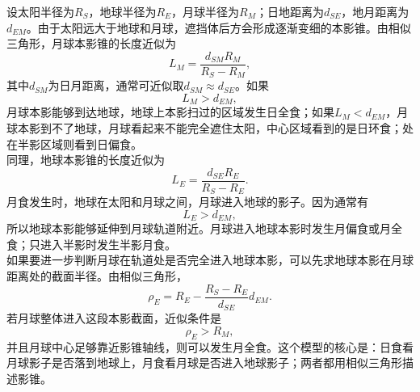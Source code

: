 \begin{casetypebox}[title={\strut\textcolor{white}{\bfseries 常见题型：日食和月食问题}}]
\begin{center}
  \end{center}
  设太阳半径为$R_S$，地球半径为$R_E$，月球半径为$R_M$；日地距离为$d_{SE}$，地月距离为$d_{EM}$。由于太阳远大于地球和月球，遮挡体后方会形成逐渐变细的本影锥。由相似三角形，月球本影锥的长度近似为
  \[
    L_M=\frac{d_{SM}R_M}{R_S-R_M},
  \]
  其中$d_{SM}$为日月距离，通常可近似取$d_{SM}\approx d_{SE}$。如果
  \[
    L_M>d_{EM},
  \]
  月球本影能够到达地球，地球上本影扫过的区域发生日全食；如果$L_M<d_{EM}$，月球本影到不了地球，月球看起来不能完全遮住太阳，中心区域看到的是日环食；处在半影区域则看到日偏食。\\
  同理，地球本影锥的长度近似为
  \[
    L_E=\frac{d_{SE}R_E}{R_S-R_E}.
  \]
  月食发生时，地球在太阳和月球之间，月球进入地球的影子。因为通常有
  \[
    L_E>d_{EM},
  \]
  所以地球本影能够延伸到月球轨道附近。月球进入地球本影时发生月偏食或月全食；只进入半影时发生半影月食。\\
  如果要进一步判断月球在轨道处是否完全进入地球本影，可以先求地球本影在月球距离处的截面半径。由相似三角形，
  \[
    \rho_E=R_E-\frac{R_S-R_E}{d_{SE}}d_{EM}.
  \]
  若月球整体进入这段本影截面，近似条件是
  \[
    \rho_E>R_M,
  \]
  并且月球中心足够靠近影锥轴线，则可以发生月全食。这个模型的核心是：日食看月球影子是否落到地球上，月食看月球是否进入地球影子；两者都用相似三角形描述影锥。
\end{casetypebox}
